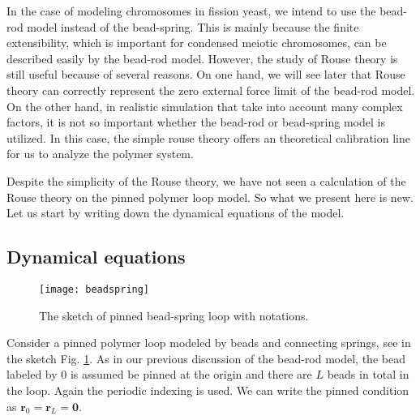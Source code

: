 In the case of modeling chromosomes in fission yeast, we intend to use the bead-rod model instead of the bead-spring. This is mainly because the finite extensibility, which is important for condensed meiotic chromosomes, can be described easily by the bead-rod model. However, the study of Rouse theory is still useful because of several reasons. On one hand, we will see later that Rouse theory can correctly represent the zero external force limit of the bead-rod model. On the other hand, in realistic simulation that take into account many complex factors, it is not so important whether the bead-rod or bead-spring model is utilized. In this case, the simple rouse theory offers an theoretical calibration line for us to analyze the polymer system.

Despite the simplicity of the Rouse theory, we have not seen a calculation of the Rouse theory on the pinned polymer loop model. So what we present here is new. Let us start by writing down the dynamical equations of the model.  

\subsection{Dynamical equations}
\label{sub:dynamical_equations}
\begin{figure}[htpb]
    \centering
    \texttt{[image: beadspring]}
    \caption{The sketch of pinned bead-spring loop with notations. }
    \label{fig:beadspringNotation}
\end{figure}

Consider a pinned polymer loop modeled by beads and connecting springs, see in the sketch Fig. \ref{fig:beadspringNotation}. As in our previous discussion of the bead-rod model, the bead labeled by $0$ is assumed be pinned at the origin and there are $L$ beads in total in the loop. Again the periodic indexing is used. We can write the pinned condition as $\mathbf{r}_0 = \mathbf{r}_L = \mathbf{0}$.

